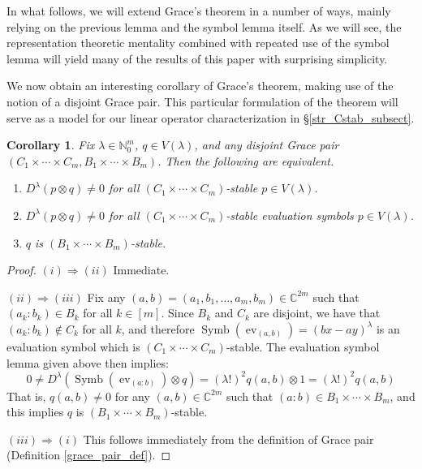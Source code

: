 \documentclass{article}
\newtheorem{corollary}[theorem]{Corollary}
\theoremstyle{definition}
\theoremstyle{plain}
\newcommand{\C}{\mathbb{C}}
\newcommand{\N}{\mathbb{N}}
\DeclareMathOperator{\Symb}{Symb}
\DeclareMathOperator{\ev}{ev}
\begin{document}
In what follows, we will extend Grace's theorem in a number of ways, mainly relying on the previous lemma and the symbol lemma itself. As we will see, the representation theoretic mentality combined with repeated use of the symbol lemma will yield many of the results of this paper with surprising simplicity.

We now obtain an interesting corollary of Grace's theorem, making use of the notion of a disjoint Grace pair. This particular formulation of the theorem will serve as a model for our linear operator characterization in \S\ref{str_Cstab_subsect}.

\begin{corollary}\label{ev_graces}
    Fix $\lambda \in \N_0^m$, $q \in V(\lambda)$, and any disjoint Grace pair $(C_1 \times \cdots \times C_m, B_1 \times \cdots \times B_m)$. Then the following are equivalent.
    \begin{enumerate}[label=(\roman*)]
        \item $D^\lambda(p \otimes q) \neq 0$ for all $(C_1 \times \cdots \times C_m)$-stable $p \in V(\lambda)$.
        \item $D^\lambda(p \otimes q) \neq 0$ for all $(C_1 \times \cdots \times C_m)$-stable evaluation symbols $p \in V(\lambda)$.
        \item $q$ is $(B_1 \times \cdots \times B_m)$-stable.
    \end{enumerate}
\end{corollary}
\begin{proof}
    $(i) \Rightarrow (ii)$ Immediate.
    
    $(ii) \Rightarrow (iii)$ Fix any $(a,b) = (a_1,b_1,\ldots,a_m,b_m) \in \C^{2m}$ such that $(a_k:b_k) \in B_k$ for all $k \in [m]$. Since $B_k$ and $C_k$ are disjoint, we have that $(a_k:b_k) \not\in C_k$ for all $k$, and therefore $\Symb(\ev_{(a,b)}) = (bx-ay)^\lambda$ is an evaluation symbol which is $(C_1 \times \cdots \times C_m)$-stable. The evaluation symbol lemma given above then implies:
    \[
        0 \neq D^\lambda(\Symb(\ev_{(a:b)}) \otimes q) = (\lambda!)^2 q(a,b) \otimes 1 = (\lambda!)^2 q(a,b)
    \]
    That is, $q(a,b) \neq 0$ for any $(a,b) \in \C^{2m}$ such that $(a:b) \in B_1 \times \cdots \times B_m$, and this implies $q$ is $(B_1 \times \cdots \times B_m)$-stable.
    
    $(iii) \Rightarrow (i)$ This follows immediately from the definition of Grace pair (Definition \ref{grace_pair_def}).
\end{proof}
\end{document}
